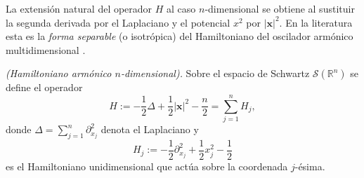             La extensión natural del operador $H$ al caso $n$-dimensional se obtiene al sustituir la segunda derivada por el Laplaciano y el potencial $x^2$ por $|\mathbf{x}|^2$. En la literatura esta es la \textit{forma separable} (o isotrópica) del Hamiltoniano del oscilador armónico multidimensional \citep{ozaktas2001fractional,brackx2006fractional}.

            \begin{definition}\label{def:Cap24HamiltonianoNd}
                \textit{(Hamiltoniano armónico $n$-dimensional).} Sobre el espacio de Schwartz $\mathcal{S}(\mathbb{R}^n)$ se define el operador
                \begin{equation}\label{eq:Cap24HNd}
                    H := -\frac{1}{2}\Delta + \frac{1}{2}|\mathbf{x}|^2 - \frac{n}{2} = \sum_{j=1}^n H_j,
                \end{equation}
                donde $\Delta = \sum_{j=1}^n \partial_{x_j}^2$ denota el Laplaciano y
                \begin{equation*}
                    H_j := -\frac{1}{2}\partial_{x_j}^2 + \frac{1}{2}x_j^2 - \frac{1}{2}
                \end{equation*}
                es el Hamiltoniano unidimensional que actúa sobre la coordenada $j$-ésima.
            \end{definition}

